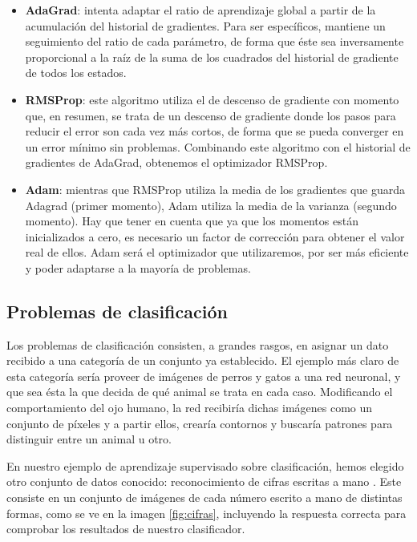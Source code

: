 \begin{itemize}
    \item \textbf{AdaGrad}: intenta adaptar el ratio de aprendizaje global a partir de la acumulación del historial de gradientes. Para ser específicos, mantiene un seguimiento del ratio de cada parámetro, de forma que éste sea inversamente proporcional a la raíz de la suma de los cuadrados del historial de gradiente de todos los estados. 
    \item \textbf{RMSProp}: este algoritmo utiliza el de descenso de gradiente con momento que, en resumen, se trata de un descenso de gradiente donde los pasos para reducir el error son cada vez más cortos, de forma que se pueda converger en un error mínimo sin problemas. Combinando este algoritmo con el historial de gradientes de AdaGrad, obtenemos el optimizador RMSProp. 
    \item \textbf{Adam}: mientras que RMSProp utiliza la media de los gradientes que guarda Adagrad (primer momento), Adam utiliza la media de la varianza (segundo momento). Hay que tener en cuenta que ya que los momentos están inicializados a cero, es necesario un factor de corrección para obtener el valor real de ellos. Adam será el optimizador que utilizaremos, por ser más eficiente y poder adaptarse a la mayoría de problemas. 
\end{itemize}

\subsection{Problemas de clasificación}
Los problemas de clasificación consisten, a grandes rasgos, en asignar un dato recibido a una categoría de un conjunto ya establecido. El ejemplo más claro de esta categoría sería proveer de imágenes de perros y gatos a una red neuronal, y que sea ésta la que decida de qué animal se trata en cada caso. Modificando el comportamiento del ojo humano, la red recibiría dichas imágenes como un conjunto de píxeles y a partir ellos, crearía contornos y buscaría patrones para distinguir entre un animal u otro.

En nuestro ejemplo de aprendizaje supervisado sobre clasificación, hemos elegido otro conjunto de datos conocido: reconocimiento de cifras escritas a mano \citep{lecun-mnisthandwrittendigit-2010}. Este consiste en un conjunto de imágenes de cada número escrito a mano de distintas formas, como se ve en la imagen \ref{fig:cifras}, incluyendo la respuesta correcta para comprobar los resultados de nuestro clasificador.

